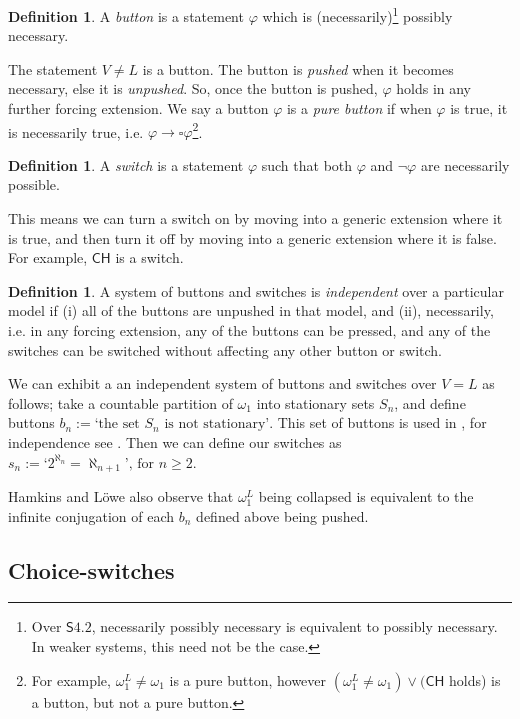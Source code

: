 \documentclass[a4paper,11pt]{amsart}
\theoremstyle{definition}
\newtheorem{definition}[theorem]{Definition}
\newcommand{\CH}{\mathsf{CH}}
\newcommand{\Sf}{\mathsf{S}4.2}
\begin{document}
\begin{definition}
    A \emph{button} is a statement  $\varphi$ which is (necessarily)\footnote{Over $\Sf$, necessarily possibly necessary is equivalent to possibly necessary. In weaker systems, this need not be the case.} possibly necessary.
\end{definition}

 The statement $V \neq L$ is a button. The button is \emph{pushed} when it becomes necessary, else it is \emph{unpushed}. So, once the button is pushed, $\varphi$ holds in any further forcing extension. We say a button $\varphi$ is a \emph{pure button} if when $\varphi$ is true, it is necessarily true, i.e. $\varphi \rightarrow \square \varphi$\footnote{For example, $\omega_1^L \neq \omega_1$ is a pure button, however $(\omega_1^L \neq \omega_1 )\lor (\CH$ holds) is a button, but not a pure button.}.  

\begin{definition}
    A \emph{switch} is a statement $\varphi$ such that both $\varphi$ and $\neg\varphi$ are necessarily possible.
\end{definition}

This means we can turn a switch on by moving into a generic extension where it is true, and then turn it off by moving into a generic extension where it is false. For example, $\CH$ is a switch. 

\begin{definition}
    A system of buttons and switches is \emph{independent} over a particular model if (i) all of the buttons are unpushed in that model, and (ii), necessarily, i.e. in any forcing extension, any of the buttons can be pressed, and any of the switches can be switched without affecting any other button or switch. 
\end{definition}

We can exhibit a an independent system of buttons and switches over $V=L$ as follows; take a countable partition of $\omega_1$ into stationary sets $S_n$, and define buttons $b_n := \text{`the set }S_n\text{ is not stationary'}$. This set of buttons is used in \cite{Hamkins-modal-logic}, for independence see \cite[23.8, 23.6]{Jech2003}. Then we can define our switches as $s_n := \text{`}2^{\aleph_n} = \aleph_{n+1} \text{',  for } n \geqslant 2.$

Hamkins and Löwe also observe that $\omega_1^L$ being collapsed is equivalent to the infinite  conjugation of each $b_n$ defined above being pushed. 

\subsection{Choice-switches}
\end{document}
